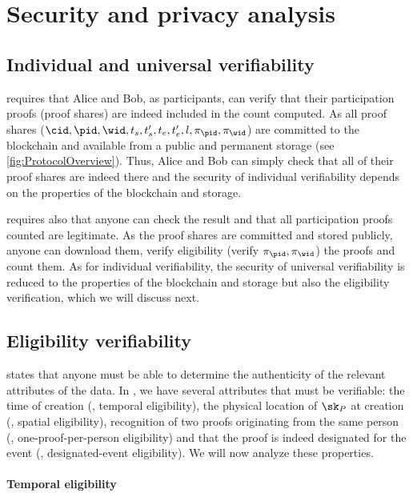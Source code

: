 \section{Security and privacy analysis}%
\label{SecurityAnalysis}

\subsection{Individual and universal verifiability}%
\label{analysis-individual}%
\label{analysis-universal}

 requires that Alice and Bob, as participants, can verify that their participation proofs (\ie proof shares) are indeed included in the count computed.
As all proof shares (\ie \(\cid, \pid, \wid, t_s, t_s', t_e, t_e', l, \pi_\pid, \pi_{\wid}\)) are committed to the blockchain and available from a public and permanent storage (see \cref{fig:ProtocolOverview}).
Thus, Alice and Bob can simply check that all of their proof shares are indeed there and the security of individual verifiability depends on the properties of the blockchain and storage.

 requires also that anyone can check the result and that all participation proofs counted are legitimate.
As the proof shares are committed and stored publicly, anyone can download them, verify eligibility (\ie verify \(\pi_\pid, \pi_{\wid}\)) the proofs and count them.
As for individual verifiability, the security of universal verifiability is reduced to the properties of the blockchain and storage but also the eligibility verification, which we will discuss next.

\subsection{Eligibility verifiability}
\label{analysis-eligibility}

 states that anyone must be able to determine the authenticity of the relevant attributes of the data.
In \PRIVO, we have several attributes that must be verifiable: the time of creation (\ie, temporal eligibility), the physical location of \(\sk_P\) at creation (\ie, spatial eligibility), recognition of two proofs originating from the same person (\ie, one-proof-per-person eligibility) and that the proof is indeed designated for the event (\ie, designated-event eligibility).
We will now analyze these properties.

\paragraph{Temporal eligibility}
\label{analysis-temporal}

